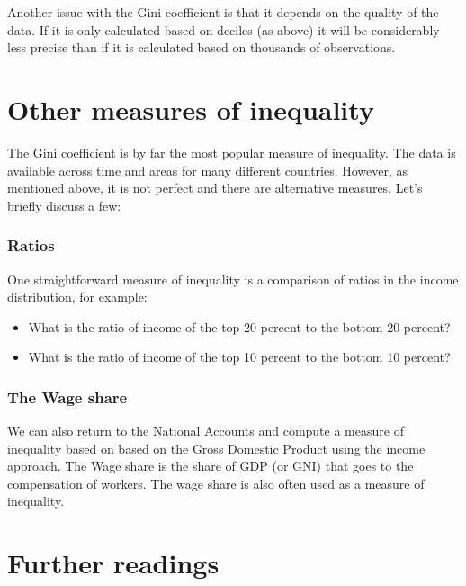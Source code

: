 \documentclass[
]{book}
\providecommand{\tightlist}{%
  \setlength{\itemsep}{0pt}\setlength{\parskip}{0pt}}
\begin{document}
Another issue with the Gini coefficient is that it depends on the quality of the data. If it is only calculated based on deciles (as above) it will be considerably less precise than if it is calculated based on thousands of observations.

\hypertarget{other-measures-of-inequality}{%
\section{Other measures of inequality}\label{other-measures-of-inequality}}

The Gini coefficient is by far the most popular measure of inequality. The data is available across time and areas for many different countries. However, as mentioned above, it is not perfect and there are alternative measures. Let's briefly discuss a few:

\hypertarget{ratios}{%
\subsubsection*{Ratios}\label{ratios}}

One straightforward measure of inequality is a comparison of ratios in the income distribution, for example:

\begin{itemize}
\tightlist
\item
  What is the ratio of income of the top 20 percent to the bottom 20 percent?
\item
  What is the ratio of income of the top 10 percent to the bottom 10 percent?
\end{itemize}

\hypertarget{the-wage-share}{%
\subsubsection*{The Wage share}\label{the-wage-share}}

We can also return to the National Accounts and compute a measure of inequality based on based on the Gross Domestic Product using the income approach. The Wage share is the share of GDP (or GNI) that goes to the compensation of workers. The wage share is also often used as a measure of inequality.

\hypertarget{further-readings-4}{%
\section{Further readings}\label{further-readings-4}}
\end{document}
